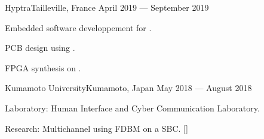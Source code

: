 
    {Hyptra}{Tailleville, France}
    {April 2019 --- September 2019}
    {\begin{additems}
        \item Embedded software developpement for .
        \item PCB design using .
        \item FPGA synthesis on .
    \end{additems}}

    {Kumamoto University}{Kumamoto, Japan}
    {May 2018 --- August 2018}
    {\begin{additems} %
        \item Laboratory: Human Interface and Cyber Communication Laboratory.
        \item Research: Multichannel  using FDBM on a SBC. []
    \end{additems}}
